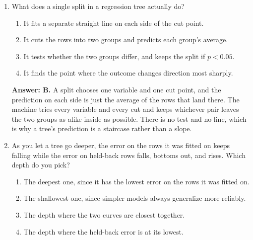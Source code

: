 \documentclass[11pt]{article}
\begin{document}
\begin{enumerate}[itemsep=14pt]
\vspace{2pt}
\textbf{Answer: C.} There is nothing wrong with the arithmetic, but the constant is doing real work on the small counts and nobody chose its value for a reason. Counts with zeros usually want a model built for counts. Dropping the zeros is worse, since those stores are often the interesting ones.
\vspace{4pt}

\item What does a single split in a regression tree actually do?

\begin{enumerate}[label=\Alph*., itemsep=1pt, topsep=3pt]
  \item It fits a separate straight line on each side of the cut point.
  \item It cuts the rows into two groups and predicts each group's average.
  \item It tests whether the two groups differ, and keeps the split if $p < 0.05$.
  \item It finds the point where the outcome changes direction most sharply.
\end{enumerate}

\vspace{2pt}
\textbf{Answer: B.} A split chooses one variable and one cut point, and the prediction on each side is just the average of the rows that land there. The machine tries every variable and every cut and keeps whichever pair leaves the two groups as alike inside as possible. There is no test and no line, which is why a tree's prediction is a staircase rather than a slope.
\vspace{4pt}

\item As you let a tree go deeper, the error on the rows it was fitted on keeps falling while the error on held-back rows falls, bottoms out, and rises. Which depth do you pick?

\begin{enumerate}[label=\Alph*., itemsep=1pt, topsep=3pt]
  \item The deepest one, since it has the lowest error on the rows it was fitted on.
  \item The shallowest one, since simpler models always generalize more reliably.
  \item The depth where the two curves are closest together.
  \item The depth where the held-back error is at its lowest.
\end{enumerate}


\end{enumerate}
\end{document}
